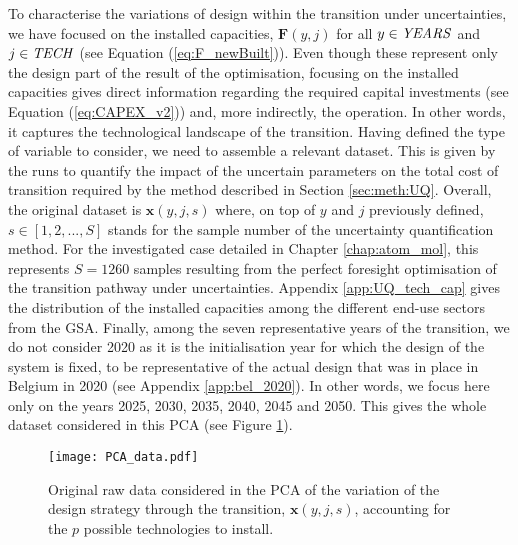 \noindent
To characterise the variations of design within the transition under uncertainties, we have focused on the installed capacities, $\textbf{F}(y,j)$ for all $y \in \text{\emph{YEARS}}$ and $j \in \text{\emph{TECH}}$ (see Equation (\ref{eq:F_newBuilt})). Even though these represent only the design part of the result of the optimisation, focusing on the installed capacities gives direct information regarding the required capital investments (see Equation (\ref{eq:CAPEX_v2})) and, more indirectly, the operation. In other words, it captures the technological landscape of the transition.  Having defined the type of variable to consider, we need to assemble a relevant dataset. This is given by the runs to quantify the impact of the uncertain parameters on the total cost of transition required by the method described in Section \ref{sec:meth:UQ}. Overall, the original dataset is $\textbf{x}(y,j,s)$ where, on top of $y$ and $j$ previously defined, $s \in [1,2,...,S]$ stands for the sample number of the uncertainty quantification method. For the investigated case detailed in Chapter \ref{chap:atom_mol}, this represents $S=1260$ samples resulting from the perfect foresight optimisation of the transition pathway under uncertainties. Appendix \ref{app:UQ_tech_cap} gives the distribution of the installed capacities among the different end-use sectors from the \gls{GSA}. Finally, among the seven representative years of the transition, we do not consider 2020 as it is the initialisation year for which the design of the system is fixed, to be representative of the actual design that was in place in Belgium in 2020 (see Appendix \ref{app:bel_2020}). In other words, we focus here only on the years 2025, 2030, 2035, 2040, 2045 and 2050. This gives the whole dataset considered in this \gls{PCA} (see Figure \ref{fig:PCA_data}). \\

\begin{figure}[!htbp]
\centering
\texttt{[image: PCA\_data.pdf]}
\caption{Original raw data considered in the \acrfull{PCA} of the variation of the design strategy through the transition, $\textbf{x}(y,j,s)$, accounting for the $p$ possible technologies to install.}
\label{fig:PCA_data}
\end{figure}

\\

